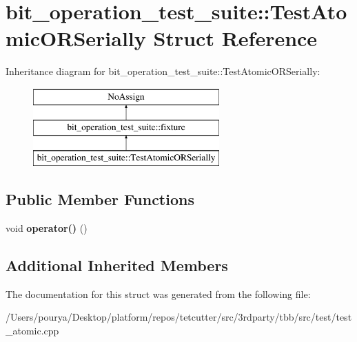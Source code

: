 \hypertarget{structbit__operation__test__suite_1_1TestAtomicORSerially}{}\section{bit\+\_\+operation\+\_\+test\+\_\+suite\+:\+:Test\+Atomic\+O\+R\+Serially Struct Reference}
\label{structbit__operation__test__suite_1_1TestAtomicORSerially}
Inheritance diagram for bit\+\_\+operation\+\_\+test\+\_\+suite\+:\+:Test\+Atomic\+O\+R\+Serially\+:\begin{figure}[H]
\begin{center}
\leavevmode
\includegraphics[height=3.000000cm]{structbit__operation__test__suite_1_1TestAtomicORSerially}
\end{center}
\end{figure}
\subsection*{Public Member Functions}
\begin{DoxyCompactItemize}
\item 
\hypertarget{structbit__operation__test__suite_1_1TestAtomicORSerially_a1bb81bbdcf20e23062ef04388a03509b}{}void {\bfseries operator()} ()\label{structbit__operation__test__suite_1_1TestAtomicORSerially_a1bb81bbdcf20e23062ef04388a03509b}

\end{DoxyCompactItemize}
\subsection*{Additional Inherited Members}


The documentation for this struct was generated from the following file\+:\begin{DoxyCompactItemize}
\item 
/\+Users/pourya/\+Desktop/platform/repos/tetcutter/src/3rdparty/tbb/src/test/test\+\_\+atomic.\+cpp\end{DoxyCompactItemize}
